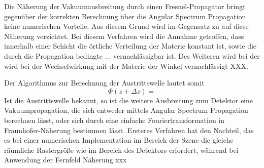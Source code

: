 	Die Näherung der Vakuumausbreitung durch einen Fresnel-Propagator bringt gegenüber der korrekten Berechnung über die Angular Spectrum Propagation keine numerischen Vorteile. Aus diesem Grund wird im Gegensatz zu \cite{hare1994} auf diese Näherung verzichtet. 
	Bei diesem Verfahren wird die Annahme getroffen, dass  innerhalb einer Schicht die örtliche Verteilung der Materie konstant ist, sowie die durch die Propagation bedingte ... vernachlässigbar ist\cite{hare1994}. Des Weiteren wird bei der wird bei der Wechselwirkung mit der Materie der Winkel vernachlässigt XXX.
	
	Der Algorithmus zur Berechnung der Austrittswelle lautet somit
	\begin{equation}
\Phi(z+\Delta z)=
	\end{equation}
	Ist die Austrittswelle bekannt, so ist die weitere Ausbreitung zum Detektor eine Vakuumpropagation, die sich entweder mittels Angular Spectrum Propagation berechnen lässt, oder sich durch eine einfache Fouriertransformation in Fraunhofer-Näherung bestimmen lässt. Ersteres Verfahren hat den Nachteil, das es bei einer numerischen Implementation im Bereich der Szene die gleiche räumliche Rastergröße wie im Bereich des Detektors erfordert, während bei Anwendung der Fernfeld Näherung xxx
